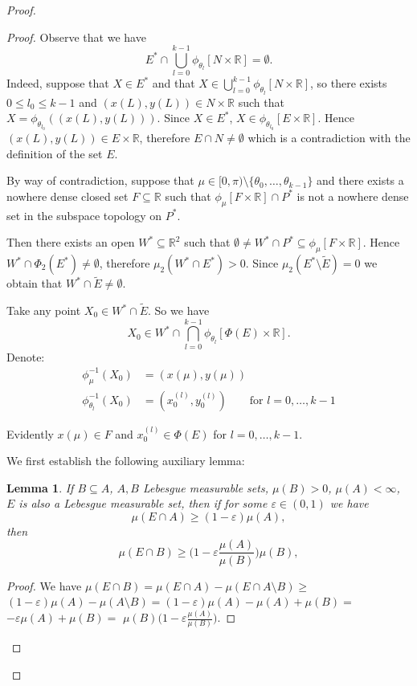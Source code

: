 \documentclass[12pt]{amsart}
\theoremstyle{plain}
\newtheorem{lemma}[theorem]{Lemma}
\theoremstyle{definition}
\theoremstyle{remark}
\newcommand{\real}{\mathbb{R}}
\begin{document}
\begin{proof}
\begin{proof}
Observe that we have
\[
  E^* \cap \bigcup_{l = 0}^{k-1} \phi_{\theta_l}[N \times \real] = \emptyset.
\]
Indeed, suppose that $X\in E^*$ and that
$X \in \bigcup_{l = 0}^{k-1} \phi_{\theta_l}[N \times \real]$,
so there exists $0 \leq l_0 \leq k - 1$ and $(x(L), y(L)) \in N \times \real$
such that $X = \phi_{\theta_{l_0}}((x(L), y(L)))$.
Since $X \in E^*$, $X \in \phi_{\theta_{l_0}}[E \times \real]$.
Hence $(x(L), y(L)) \in E \times \real$, therefore $E \cap N \not= \emptyset$
which is a contradiction with the definition of the set $E$.

By way of contradiction, suppose that
$\mu \in [0, \pi) \setminus \lbrace \theta_0,\ldots,\theta_{k-1} \rbrace$
and there exists a nowhere dense closed set $F \subseteq \real$
such that $\phi_{\mu}[F \times \real] \cap P^*$ is not a nowhere dense
set in the subspace topology on $P^*$.

Then there exists an open $W^* \subseteq \real^2$ 
such that $\emptyset \not= W^* \cap P^* \subseteq \phi_{\mu}[F \times \real]$.
Hence $W^* \cap \Phi_2(E^*) \not= \emptyset$, therefore
$\mu_2(W^* \cap E^*) > 0$. Since $\mu_2(E^* \setminus \tilde{E}) = 0$
we obtain that $W^* \cap \tilde{E} \not= \emptyset$.

Take any point $X_0 \in W^* \cap \tilde{E}$. So we have
\[
  X_0 \in W^* \cap \bigcap_{l = 0}^{k-1} \phi_{\theta_l}[\Phi(E) \times \real].
\]
Denote:
\begin{align*}
\phi^{-1}_{\mu}(X_0) &= (x(\mu), y(\mu)) \\
\phi^{-1}_{\theta_l}(X_0) &= (x^{(l)}_0, y^{(l)}_0) \qquad \text{for }l = 0,\ldots, k-1 
\end{align*}

Evidently
$x(\mu) \in F$ and $x^{(l)}_0 \in \Phi(E)$ for $l = 0, \ldots, k-1$.

We first establish the following auxiliary lemma:
\begin{lemma}\label{lemma:change-in-density}
  If $B \subseteq A$, $A, B$ Lebesgue measurable sets, $\mu(B) > 0$, $\mu(A) < \infty$,
  $E$ is also a Lebesgue measurable set, then if
  for some $\varepsilon \in (0,1)$ we have
  \[
  \mu(E \cap A) \geq (1 - \varepsilon) \mu(A),
\]
then
\[
  \mu(E \cap B) \geq \big(1 - \varepsilon \frac{\mu(A)}{\mu(B)}\big) \mu(B),
\]
\end{lemma}
\begin{proof}
  We have
  $\mu(E \cap B) = \mu(E \cap A) - \mu(E \cap A \setminus B) \geq$
  $(1 - \varepsilon) \mu(A) - \mu(A \setminus B) =
  (1 - \varepsilon) \mu(A) - \mu(A) + \mu(B) =$
  $- \varepsilon \mu(A) + \mu(B) = $
  $\mu(B) \big(1 - \varepsilon \frac{\mu(A)}{\mu(B)}\big)$.
\end{proof}


\end{proof}
\end{proof}
\end{document}
